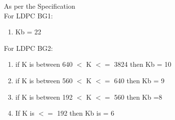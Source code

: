 \documentclass[journal,twocolumn]{IEEEtran}
\begin{document}
{{\begin{enumerate}
As per the Specification\\

For LDPC BG1:\\
\begin{enumerate}
  \item        Kb = 22 \\
  \end{enumerate}
For LDPC BG2:\\
\begin{enumerate}
 \item     if K is between 640 $<$ K $<=$ 3824 then Kb = 10\\
  \item    if K is between 560 $<$ K $<=$ 640 then Kb = 9\\
  \item    if K is between 192 $<$ K $<=$ 560 then Kb =8\\
  \item    If K is $<=$ 192 then Kb is = 6\\
    \end{enumerate}
    

\end{enumerate}}}
\end{document}
